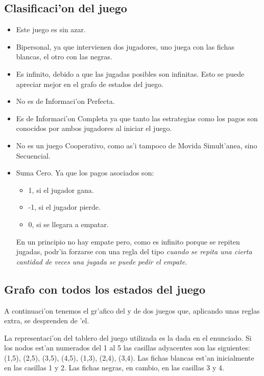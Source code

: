 \subsection{Clasificaci'on del juego}
\begin{itemize}
\item Este juego es sin azar.

\item Bipersonal, ya que intervienen dos jugadores, uno juega con las fichas blancas, el otro con las negras.

\item Es infinito, debido a que las jugadas posibles son infinitas. Esto se puede apreciar mejor en el grafo de estados del juego.

\item No es de Informaci'on Perfecta.

\item Es de Informaci'on Completa ya que tanto las estrategias como los pagos son conocidos por ambos jugadores al iniciar el juego.

\item No es un juego Cooperativo, como as'i tampoco de Movida Simult'anea, sino Secuencial.

\item Suma Cero. Ya que los pagos asociados son:
\begin{itemize}
\item 1, si el jugador gana.
\item -1, si el jugador pierde.
\item 0, si se llegara a empatar.
\end{itemize}
En un principio no hay empate pero, como es infinito porque se repiten jugadas, podr'ia forzarse con una regla del tipo \it{cuando se repita una cierta cantidad de veces una jugada se puede pedir el empate}.
\end{itemize}


\subsection{Grafo con todos los estados del juego}

A continuaci'on tenemos el gr'afico del  y de dos juegos que, aplicando unas reglas extra, se desprenden de 'el.

La representaci'on del tablero del juego utilizada es la dada en el enunciado. Si los nodos est'an numerados del 1 al 5 las casillas adyacentes son las siguientes: (1,5), (2,5), (3,5), (4,5), (1,3), (2,4), (3,4). Las fichas blancas est'an inicialmente en las casillas 1 y 2. Las fichas negras, en cambio, en las casillas 3 y 4.

